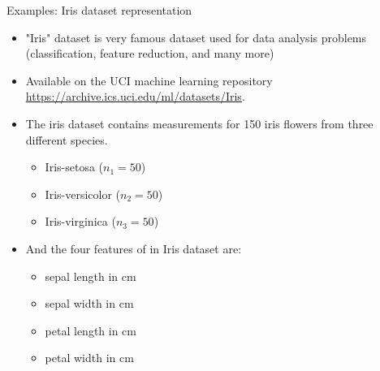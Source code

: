 

\begin{frame}{Examples: Iris dataset representation}
\begin{itemize}
\item "Iris" dataset is very famous dataset used for data analysis problems (classification, feature reduction, and many more)
\item Available on the UCI machine learning repository
\url{https://archive.ics.uci.edu/ml/datasets/Iris}.
\item The iris dataset contains measurements for 150 iris flowers from three different species.
\begin{itemize}
\item Iris-setosa ($n_1=50$)
\item Iris-versicolor ($n_2=50$)
\item Iris-virginica ($n_3=50$)
\end{itemize}
\item And the four features of in Iris dataset are:
\begin{itemize}
\item sepal length in cm
\item sepal width in cm
\item petal length in cm
\item petal width in cm
\end{itemize}
\end{itemize}
\end{frame}

